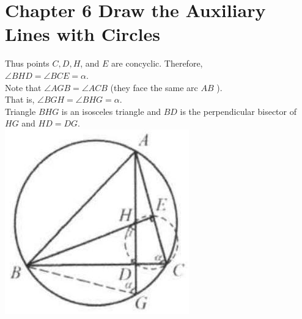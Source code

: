 \documentclass[10pt]{article}
\begin{document}
\section*{Chapter 6 Draw the Auxiliary Lines with Circles}
Thus points \(C, D, H\), and \(E\) are concyclic. Therefore,\\
\(\angle B H D=\angle B C E=\alpha\).\\
Note that \(\angle A G B=\angle A C B\) (they face the same arc \(A B\) ).\\
That is, \(\angle B G H=\angle B H G=\alpha\).\\
Triangle \(B H G\) is an isosceles triangle and \(B D\) is the perpendicular bisector of \(H G\) and \(H D=D G\).\\
\includegraphics[max width=\textwidth, center]{2025_04_17_97bc1f7e44d93c271a88g-210}
\end{document}
